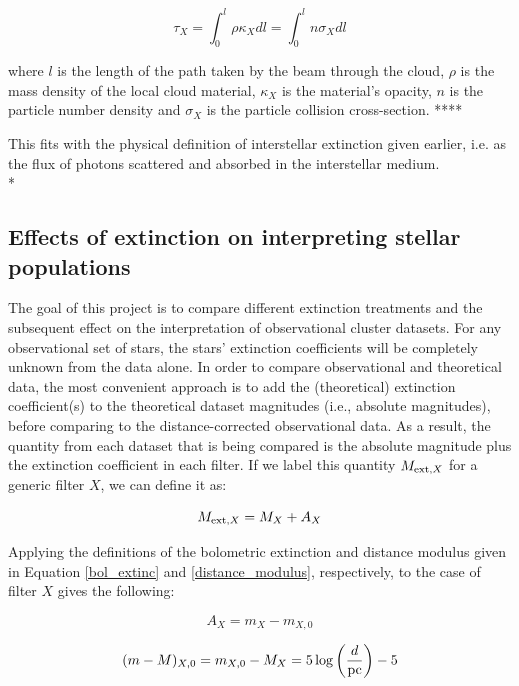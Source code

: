 \documentclass[12pt, a4paper]{report}
\begin{document}
\begin{equation}
\tau_{X} = \int_{0}^{l} \rho \kappa_{X} dl = \int_{0}^{l} n \sigma_{X} dl
\label{optical_depth}
\end{equation}

where $l$ is the length of the path taken by the beam through the cloud, $\rho$ is the mass density of the local cloud material, $\kappa_{X}$ is the material's opacity, $n$ is the particle number density and $\sigma_{X}$ is the particle collision cross-section.
****

This fits with the physical definition of interstellar extinction given earlier, i.e. as the flux of photons scattered and absorbed in the interstellar medium. \\*

\subsection{Effects of extinction on interpreting stellar populations} \label{extinc_desc}

The goal of this project is to compare different extinction treatments and the subsequent effect on the interpretation of observational cluster datasets. For any observational set of stars, the stars' extinction coefficients will be completely unknown from the data alone. In order to compare observational and theoretical data, the most convenient approach is to add the (theoretical) extinction coefficient(s) to the theoretical dataset magnitudes (i.e., absolute magnitudes), before comparing to the distance-corrected observational data. As a result, the quantity from each dataset that is being compared is the absolute magnitude plus the extinction coefficient in each filter. If we label this quantity $M_{\textnormal{ext},X}$ for a generic filter $X$, we can define it as:

\begin{equation}
M_{\textnormal{ext},X} = M_{X} + A_{X}
\label{MextX_def}
\end{equation}

Applying the definitions of the bolometric extinction and distance modulus given in Equation \ref{bol_extinc} and \ref{distance_modulus}, respectively, to the case of filter $X$ gives the following:

\begin{equation}
A_{X} = m_{X} - m_{X,0}
\label{extinc_X}
\end{equation}

\begin{equation}
(m - M)_{X,0} = m_{X,0} - M_{X} = 5\log\left(\frac{d}{\textnormal{pc}}\right) - 5
\label{DM_X}
\end{equation}
\end{document}
